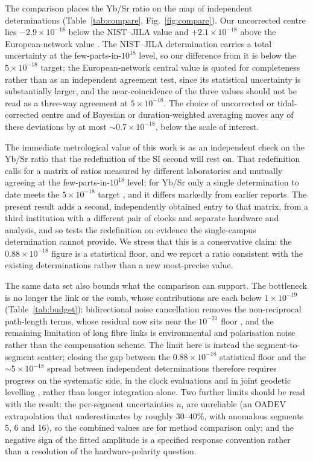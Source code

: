 \documentclass[11pt,a4paper]{article}
\newcommand{\e}[1]{\times 10^{#1}}
\begin{document}
The comparison places the Yb/Sr ratio on the map of independent
determinations (Table~\ref{tab:compare}, Fig.~\ref{fig:compare}). Our
uncorrected centre lies
$-2.9\e{-18}$ below the NIST--JILA value \citep{aeppli2026nist} and
$+2.1\e{-18}$ above the European-network value
\citep{pizzocaro2026european}. The NIST--JILA determination carries a total
uncertainty at the few-parts-in-$10^{18}$ level, so our difference from it
is below the $5\e{-18}$ target; the European-network central value is
quoted for completeness rather than as an independent agreement test,
since its statistical uncertainty is substantially larger, and the
near-coincidence of the three values should not be read as a three-way
agreement at $5\e{-18}$. The choice of uncorrected or tidal-corrected
centre and of Bayesian or duration-weighted averaging moves any of these
deviations by at most $\sim0.7\e{-18}$, below the scale of interest.

The immediate metrological value of this work is as an independent check
on the Yb/Sr ratio that the redefinition of the SI second will rest on.
That redefinition calls for a matrix of ratios measured by different
laboratories and mutually agreeing at the few-parts-in-$10^{18}$ level;
for Yb/Sr only a single determination to date meets the $5\e{-18}$ target
\citep{aeppli2026nist}, and it differs markedly from earlier reports. The
present result adds a second, independently obtained entry to that
matrix, from a third institution with a different pair of clocks and
separate hardware and analysis, and so tests the redefinition on evidence
the single-campus determination cannot provide. We stress that this is a
conservative claim: the $0.88\e{-18}$ figure is a statistical floor, and
we report a ratio consistent with the existing determinations rather than
a new most-precise value.

The same data set also bounds what the comparison can support. The
bottleneck is no longer the link or the comb, whose contributions are each
below $1\e{-19}$ (Table~\ref{tab:budget}): bidirectional noise
cancellation removes the non-reciprocal path-length terms, whose residual
now sits near the $10^{-21}$ floor \citep{schioppo2022cavities,
chen2026dissemination}, and the remaining limitation of long fibre links
is environmental and polarisation noise rather than the compensation
scheme. The limit here is instead the segment-to-segment
scatter; closing the gap between the $0.88\e{-18}$ statistical floor and
the $\sim5\e{-18}$ spread between independent determinations therefore
requires progress on the systematic side, in the clock evaluations
\citep{zhu2026yb, jia2026sr} and in joint geodetic levelling
\citep{denker2018geodetic}, rather than
longer integration alone. Two further limits should be read with the
result: the per-segment uncertainties $u_i$ are unreliable (an OADEV
extrapolation that underestimates by roughly $30$--$40\%$, with anomalous
segments 5, 6 and 16), so the combined values are for method comparison
only; and the negative sign of the fitted amplitude is a specified
response convention rather than a resolution of the hardware-polarity
question.
\end{document}
